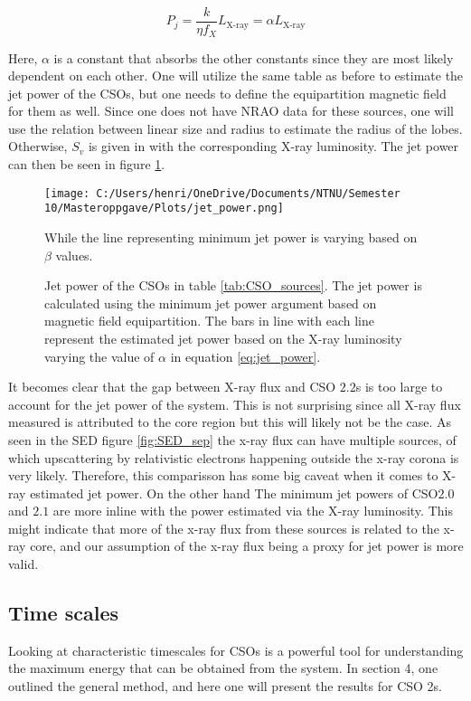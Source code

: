 \begin{equation}
    \label{eq:jet_power}
    P_j = \frac{k}{\eta f_X} L_{\text{X-ray}} = \alpha L_{\text{X-ray}}
\end{equation}

Here, $\alpha$ is a constant that absorbs the other constants since they are most likely dependent on each other. One will utilize the same table as before to estimate the jet power of the CSOs, but one needs to define the equipartition magnetic field for them as well. Since one does not have NRAO data for these sources, one will use the relation between linear size and radius to estimate the radius of the lobes. Otherwise, $S_v$ is given in \cite{W_jtowicz_2020} with the corresponding X-ray luminosity. The jet power can then be seen in figure \ref{fig:jet_power}.


\begin{figure}
    \centering
    \texttt{[image: C:/Users/henri/OneDrive/Documents/NTNU/Semester 10/Masteroppgave/Plots/jet\_power.png]}
    \caption{Jet power of the CSOs in table \ref{tab:CSO_sources}. The jet power is calculated using the minimum jet power argument based on magnetic field equipartition. The bars in line with each line represent the estimated jet power based on the X-ray luminosity varying the value of $\alpha$ in equation \ref{eq:jet_power}.} While the line representing minimum jet power is varying based on $\beta$ values. 
    \label{fig:jet_power}
\end{figure}

It becomes clear that the gap between X-ray flux and CSO $2.2$s is too large to account for the jet power of the system. This is not surprising since all X-ray flux measured is attributed to the core region but this will likely not be the case. As seen in the SED figure \ref{fig:SED_sep} the x-ray flux can have multiple sources, of which upscattering by relativistic electrons happening outside the x-ray corona is very likely. Therefore, this comparisson has some big caveat when it comes to X-ray estimated jet power. On the other hand The minimum jet powers of CSO$2.0$ and $2.1$ are more inline with the power estimated via the X-ray luminosity. This might indicate that more of the x-ray flux from these sources is related to the x-ray core, and our assumption of the x-ray flux being a proxy for jet power is more valid. 


\subsection{Time scales }
Looking at characteristic timescales for CSOs is a powerful tool for understanding the maximum energy that can be obtained from the system. In section 4, one outlined the general method, and here one will present the results for CSO 2s.

